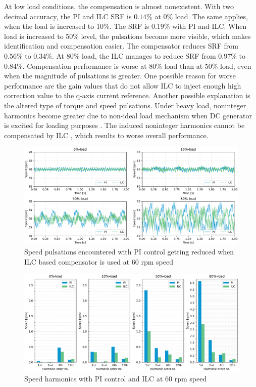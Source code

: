 At low load conditions, the compensation is almost nonexistent. With two decimal accuracy, the PI and ILC SRF is $0.14$\% at 0\% load. The same applies, when the load is increased to 10\%. The SRF is $0.19\%$ with PI and ILC. When load is increased to 50\% level, the pulsations become more visible, which makes identification and compensation easier. The compensator reduces SRF from $0.56 \%$ to $0.34 \%$. At 80\% load, the ILC manages to reduce SRF from $0.97\%$ to $0.84\%$. Compensation performance is worse at 80\% load than at 50\% load, even when the magnitude of pulsations is greater. One possible reason for worse performance are the gain values that do not allow ILC to inject enough high correction value to the q-axis current reference. Another possible explanation is the altered type of torque and speed pulsations. Under heavy load, noninteger harmonics become greater due to non-ideal load mechanism when DC generator is excited for loading purposes \cite{ILC:Book2009}. The induced noninteger harmonics cannot be compensated by ILC \cite{ILC:2005, ILC:Book2009}, which results to worse overall performance.
\begin{figure}[p] 
    \centering
    \includegraphics[width=1.0\linewidth]{images/PI-ILC-comparison-time-domain.pdf} 
    \caption{Speed pulsations encountered with PI control getting reduced when ILC based compensator is used at 60 rpm speed}
    \label{Fig:experiment-ilc-speed}
\end{figure}

\begin{figure}[p] 
    \centering
    \includegraphics[width=1.0\linewidth]{images/PI-ILC-comparison-harmonics.pdf} 
    \caption{Speed harmonics with PI control and ILC at $60$ rpm speed}
    \label{Fig:experiment-ilc-harmonics-speed}
\end{figure}

